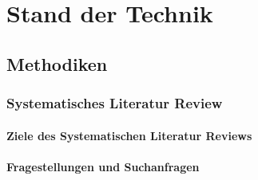 \chapter{Stand der Technik}
\label{chap:technikStand}


    \section{Methodiken}
    \label{sec:methodiken}

        \subsection{Systematisches Literatur Review}
        \label{subsec:systematischesLiteraturReview}

        \subsubsection*{Ziele des Systematischen Literatur Reviews}

        \subsubsection*{Fragestellungen und Suchanfragen}